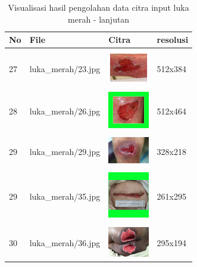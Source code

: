 \begin{table}[H]
	\centering
	\caption{Visualisasi hasil pengolahan data citra input luka merah - lanjutan}
	\label{tabel_input_12}
	\begin{tabular}{|m{0.2in}|m{1.2in}|m{0.7in}|m{0.7in}|}
		\hline
		\textbf{No} & \textbf{File} & \textbf{Citra} & \textbf{resolusi} \\
		\hline

		& &  &  \\
		27& 
		luka\_merah/23.jpg &
		\includegraphics[width=0.7in]{gambar/dataset_citra/luka_merah/23.jpg}&
		512x384\\
		\hline
		
		& &  &  \\
		28& 
		luka\_merah/26.jpg &
		\includegraphics[width=0.7in]{gambar/dataset_citra/luka_merah/26.jpg}&
		512x464\\
		\hline
		
		& &  &  \\
		29 & 
		luka\_merah/29.jpg &
		\includegraphics[width=0.7in]{gambar/dataset_citra/luka_merah/29.jpg}&
		328x218\\
		\hline
		
		& &  &  \\
		29& 
		luka\_merah/35.jpg &
		\includegraphics[width=0.7in]{gambar/dataset_citra/luka_merah/35.jpg}&
		261x295\\
		\hline
		
		& &  &  \\
		30& 
		luka\_merah/36.jpg &
		\includegraphics[width=0.7in]{gambar/dataset_citra/luka_merah/36.jpg}&
		295x194\\
		\hline
		

\end{tabular}
\end{table}
